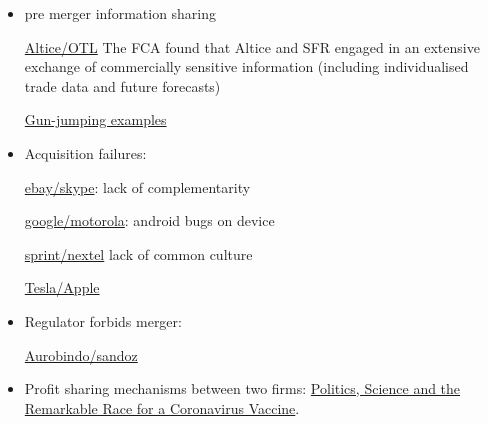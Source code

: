 \documentclass[a4paper,leqno]{article}%
\begin{document}
\begin{itemize}
    \item pre merger information sharing
    
    \href{https://sites-herbertsmithfreehills.vuturevx.com/46/12874/compose-email/the-altice-case--a-costly-warning-not-to-engage-in-gun-jumping-before-receiving-merger-control-clearance.asp}{Altice/OTL} The FCA found that Altice and SFR engaged in an extensive exchange of commercially sensitive information (including individualised trade data and future forecasts)
    
    \href{https://www.twobirds.com/en/news/articles/2020/global/double-caution-gun-jumping-risks-in-m-and-a-transactions}{Gun-jumping examples}
    \item Acquisition failures:
    
    \href{https://www.investopedia.com/articles/insights/061816/4-cases-when-ma-strategy-failed-acquirer-ebay-bac.asp}{ebay/skype}: lack of complementarity
    
    \href{https://salessynergy.net/the-biggest-acquisition-disasters-that-put-companies-into-quite-a-bit-of-trouble/}{google/motorola}: android bugs on device
    
    \href{https://www.investopedia.com/articles/financial-theory/08/merger-acquisition-disasters.asp#:~:text=The\%20consolidation\%20of\%20AOL\%20Time,combination\%20up\%20until\%20that\%20time}{sprint/nextel} lack of common culture
    
    \href{https://www.theguardian.com/technology/2020/dec/23/elon-musk-i-tried-to-sell-tesla-to-apple?CMP=Share_iOSApp_Other}{Tesla/Apple}
    
    \item Regulator forbids merger:
    
    \href{https://www.livemint.com/companies/news/aurobindo-pharma-calls-off-1-billion-deal-with-sandoz-after-failing-to-get-ftc-nod-11585801128011.html}{Aurobindo/sandoz}
    
    \item Profit sharing mechanisms between two firms: \href{https://www.nytimes.com/2020/11/21/us/politics/coronavirus-vaccine.html?referringSource=articleShare}{Politics, Science and the Remarkable Race for a Coronavirus Vaccine}.
\end{itemize}
\end{document}
